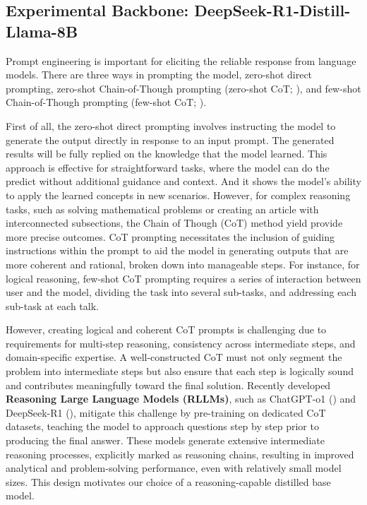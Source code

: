 \subsection*{Experimental Backbone: DeepSeek-R1-Distill-Llama-8B}


Prompt engineering is important for eliciting the reliable response from language models. There are three ways in prompting the model, zero-shot direct prompting, zero-shot Chain-of-Though prompting (zero-shot CoT; \cite{kojima2022large}), and few-shot Chain-of-Though prompting (few-shot CoT; \cite{wei2022chain}).

%
First of all, the zero-shot direct prompting involves instructing the model to generate the output directly in response to an input prompt. The generated results will be fully replied on the knowledge that the model learned. This approach is effective for straightforward tasks, where the model can do the predict without additional guidance and context. And it shows the model's ability to apply the learned concepts in new scenarios. However, for complex reasoning tasks, such as solving mathematical problems or creating an article with interconnected subsections, the Chain of Though (CoT) method yield provide more precise outcomes. CoT prompting necessitates the inclusion of guiding instructions within the prompt to aid the model in generating outputs that are more coherent and rational, broken down into manageable steps. For instance, for logical reasoning, few-shot CoT prompting requires a series of interaction between user and the model, dividing the task into several sub-tasks, and addressing each sub-task at each talk.


However, creating logical and coherent CoT prompts is challenging due to requirements for multi-step reasoning, consistency across intermediate steps, and domain-specific expertise. A well-constructed CoT must not only segment the problem into intermediate steps but also ensure that each step is logically sound and contributes meaningfully toward the final solution. Recently developed \textbf{Reasoning Large Language Models (RLLMs)}, such as ChatGPT-o1 (\cite{jaech2024openai}) and DeepSeek-R1 (\cite{shao2024deepseekmath}), mitigate this challenge by pre-training on dedicated CoT datasets, teaching the model to approach questions step by step prior to producing the final answer. These models generate extensive intermediate reasoning processes, explicitly marked as reasoning chains, resulting in improved analytical and problem-solving performance, even with relatively small model sizes. This design motivates our choice of a reasoning-capable distilled base model.


